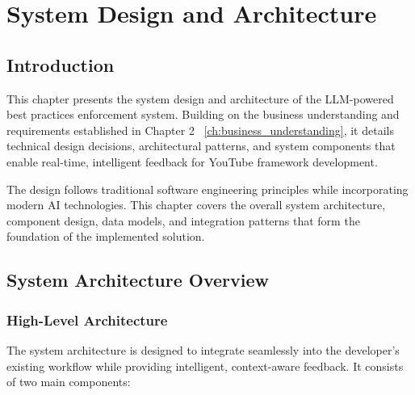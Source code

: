 
\setcounter{chapter}{2}
\chapter{System Design and Architecture}
\label{ch:system_design}
\minitoc %
\graphicspath{{Chapitre3/figures/}}

\pagestyle{fancy}
\fancyhf{}
\fancyhead[R]{\bfseries\rightmark}
\fancyfoot[R]{\thepage}
\renewcommand{\headrulewidth}{0.5pt}
\renewcommand{\footrulewidth}{0pt}
\renewcommand{\chaptermark}[1]{\markboth{{\chaptername~\thechapter. #1 }}{}}
\renewcommand{\sectionmark}[1]{\markright{\thechapter.\thesection~ #1}}

\begin{spacing}{1.2}

\section*{Introduction}
This chapter presents the system design and architecture of the LLM-powered best practices enforcement system. Building on the business understanding and requirements established in Chapter 2 ~\ref{ch:business_understanding}, it details technical design decisions, architectural patterns, and system components that enable real-time, intelligent feedback for YouTube framework development.

The design follows traditional software engineering principles while incorporating modern AI technologies. This chapter covers the overall system architecture, component design, data models, and integration patterns that form the foundation of the implemented solution.

\section{System Architecture Overview}

\subsection{High-Level Architecture}
The system architecture is designed to integrate seamlessly into the developer's existing workflow while providing intelligent, context-aware feedback. It consists of two main components:


\end{spacing}
